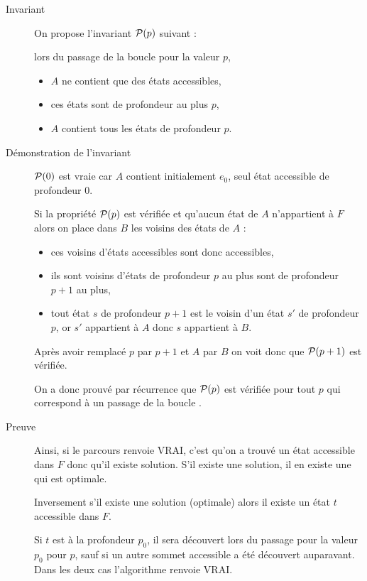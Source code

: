 \begin{Exercise} 
\begin{description}
\item[Invariant] On propose l'invariant ${\cal P}(p)$ suivant :

lors du passage de la boucle  pour la valeur $p$, 

\begin{itemize}
  \item $A$ ne contient que des états accessibles,
  \item ces états sont de profondeur au plus $p$,
  \item $A$ contient tous les états de profondeur $p$.
\end{itemize}
\item[Démonstration de l'invariant]

${\cal P}(0)$ est vraie car $A$ contient initialement $e_0$, seul état accessible de profondeur 0.

Si la propriété ${\cal P}(p)$ est vérifiée et qu'aucun état de $A$ n'appartient à $F$ alors on place dans $B$ les voisins des états de $A$ :

\begin{itemize}
  \item ces voisins d'états accessibles sont donc accessibles,
  \item ils sont voisins d'états de profondeur $p$ au plus sont de profondeur $p+1$ au plus,
  \item tout état $s$ de profondeur $p+1$ est le voisin d'un état $s'$ de profondeur $p$, or $s'$ appartient à $A$ donc $s$ appartient à $B$.
\end{itemize}

Après avoir remplacé $p$ par $p+1$ et $A$ par $B$ on voit donc que ${\cal P}(p+1)$ est vérifiée.

On a donc prouvé par récurrence que ${\cal P}(p)$ est vérifiée pour tout $p$ qui correspond à un passage de la boucle .
\newpage
\item[Preuve]
Ainsi, si le parcours renvoie VRAI, c'est qu'on a trouvé un état accessible dans $F$ donc qu'il existe solution.
S'il existe une solution, il en existe une qui est optimale.

Inversement s'il existe une solution (optimale) alors il existe un état $t$ accessible dans $F$.

Si $t$ est à la profondeur $p_0$, il sera découvert lors du passage pour la valeur $p_0$ pour $p$, sauf si un autre sommet accessible a été découvert auparavant. Dans les deux cas l'algorithme renvoie VRAI.
\end{description}
\end{Exercise}
